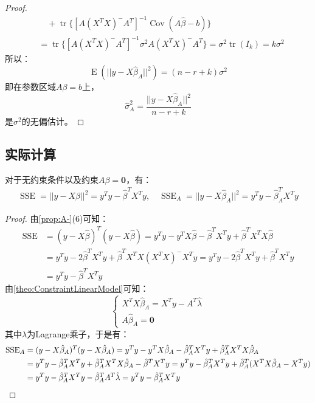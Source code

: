 \begin{proof}
\begin{align*}
		&\quad+\operatorname{tr}\{[A(X^TX)^-A^T]^{-1}\operatorname{Cov}(A\hat{\beta}-b)\} \\
		&=\operatorname{tr}\{[A(X^TX)^-A^T]^{-1}\sigma^2A(X^TX)^-A^T\}=\sigma^2\operatorname{tr}(I_k)=k\sigma^2
	\end{align*}
	所以：
	\begin{equation*}
		\operatorname{E}(||y-X\hat{\beta}_A||^2)=(n-r+k)\sigma^2
	\end{equation*}
	即在参数区域$A\beta=b$上，
	\begin{equation*}
		\hat{\sigma}_A^2=\frac{||y-X\hat{\beta}_A||^2}{n-r+k}
	\end{equation*}
	是$\sigma^2$的无偏估计。
\end{proof}

\subsection{实际计算}
\begin{theorem}\label{theo:SSESSEACalculate}
	对于无约束条件以及约束$A\beta=\mathbf{0}$，有：
	\begin{gather*}
		\operatorname{SSE}=||y-X\hat{\beta}||^2=y^Ty-\hat{\beta}^TX^Ty,\quad
		\operatorname{SSE}_A=||y-X\hat{\beta}_A||^2=y^Ty-\hat{\beta}_A^TX^Ty
	\end{gather*}
\end{theorem}
\begin{proof}
	由\cref{prop:A-}(6)可知：
	\begin{align*}
		\operatorname{SSE}&=(y-X\hat{\beta})^T(y-X\hat{\beta})=y^Ty-y^TX\hat{\beta}-\hat{\beta}^TX^Ty+\hat{\beta}^TX^TX\hat{\beta} \\
		&=y^Ty-2\hat{\beta}^TX^Ty+\hat{\beta}^TX^TX(X^TX)^-X^Ty=y^Ty-2\hat{\beta}^TX^Ty+\hat{\beta}^TX^Ty \\
		&=y^Ty-\hat{\beta}^TX^Ty
	\end{align*}
	由\cref{theo:ConstraintLinearModel}可知：
	\begin{equation*}
		\begin{cases}
			X^TX\hat{\beta}_A=X^Ty-A^T\hat{\lambda} \\
			A\hat{\beta}_A=\mathbf{0}
		\end{cases}
	\end{equation*}
	其中$\lambda$为Lagrange乘子，于是有：
	\begin{align*}
		\operatorname{SSE}_A&=(y-X\hat{\beta}_A)^T(y-X\hat{\beta}_A)=y^Ty-y^TX\hat{\beta}_A-\hat{\beta}_A^TX^Ty+\hat{\beta}_A^TX^TX\hat{\beta}_A \\
		&=y^Ty-\hat{\beta}_A^TX^Ty+\hat{\beta}_A^TX^TX\hat{\beta}_A-\hat{\beta}^TX^Ty=y^Ty-\hat{\beta}_A^TX^Ty+\hat{\beta}_A^T(X^TX\hat{\beta}_A-X^Ty) \\
		&=y^Ty-\hat{\beta}_A^TX^Ty-\hat{\beta}_A^TA^T\hat{\lambda}=y^Ty-\hat{\beta}_A^TX^Ty\qedhere
	\end{align*}
\end{proof}
